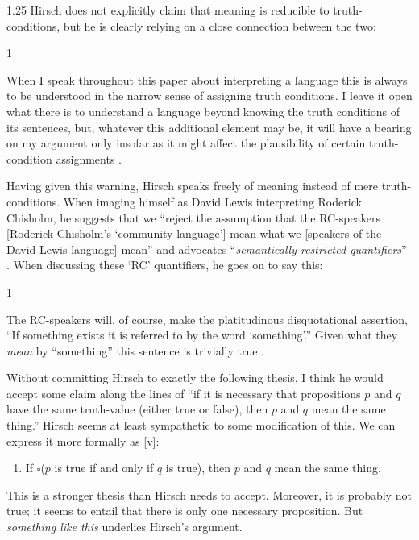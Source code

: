 \documentclass[11pt]{article}
\newenvironment{squote}{%
\begin{spacing}{1}
       	\begin{list}{}{%
\setlength{\labelwidth}{0pt}%
\rightmargin\leftmargin%
}
\item\relax
}{%
\end{list}%
\end{spacing}
}
\begin{document}
\begin{spacing}{1.25}
Hirsch does not explicitly claim that meaning is reducible to
truth-conditions, but he is clearly relying on a close connection
between the two:

\begin{squote}
When I speak throughout this paper about interpreting a language this
is always to be understood in the narrow sense of assigning truth
conditions.  I leave it open what there is to understand a language
beyond knowing the truth conditions of its sentences, but, whatever
this additional element may be, it will have a bearing on my argument
only insofar as it might affect the plausibility of certain
truth-condition assignments \citeyearpar[72]{hirsch2005}.
\end{squote}

Having given this warning, Hirsch speaks freely of meaning instead of
mere truth-conditions.  When imaging himself as David Lewis
interpreting Roderick Chisholm, he suggests that we ``reject the
assumption that the RC-speakers [Roderick Chisholm's `community
  language'] mean what we [speakers of the David Lewis language]
mean'' \citeyearpar[76]{hirsch2005} and advocates ``{\em semantically
  restricted quantifiers}'' \citeyearpar[76, his
  emphasis]{hirsch2005}.  When discussing these `RC' quantifiers, he
goes on to say this:

\begin{squote}
The RC-speakers will, of course, make the platitudinous disquotational
assertion, ``If something exists it is referred to by the word
`something'.''  Given what they {\em mean} by ``something'' this
sentence is trivially true \citeyearpar[77, my emphasis]{hirsch2005}.
\end{squote}

Without committing Hirsch to exactly the following thesis, I think he
would accept some claim along the lines of ``if it is necessary that
propositions $p$ and $q$ have the same truth-value (either true or
false), then $p$ and $q$ mean the same thing.''  Hirsch seems at least
sympathetic to some modification of this.  We can express it more
formally as \ref{v}:
\begin{enumerate}[itemindent=25pt, label=(M)]
    \item If $\square$($p$ is true if and only if $q$ is true), then
      $p$ and $q$ mean the same thing. \label{v}
\end{enumerate}

This is a stronger thesis than Hirsch needs to accept.  Moreover, it
is probably not true; it seems to entail that there is only one
necessary proposition.  But {\em something like this} underlies
Hirsch's argument.


\end{spacing}
\end{document}
